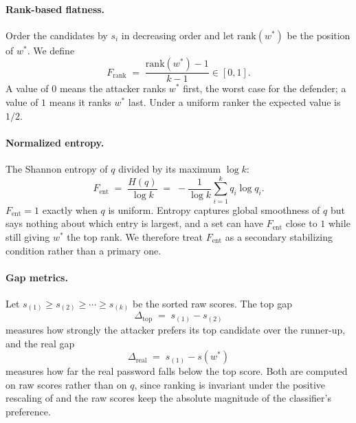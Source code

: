 \paragraph{Rank-based flatness.}
Order the candidates by $s_i$ in decreasing order and let
$\text{rank}(w^{*})$ be the position of $w^{*}$. We define
%
\begin{equation}
F_{\text{rank}} \;=\; \frac{\text{rank}(w^{*}) - 1}{k - 1} \in [0, 1].
\end{equation}
%
A value of $0$ means the attacker ranks $w^{*}$ first, the worst case
for the defender; a value of $1$ means it ranks $w^{*}$ last. Under a
uniform ranker the expected value is $1/2$.

\paragraph{Normalized entropy.}
The Shannon entropy of $q$ divided by its maximum $\log k$:
%
\begin{equation}
F_{\text{ent}} \;=\; \frac{H(q)}{\log k}
\;=\; -\frac{1}{\log k}\sum_{i=1}^{k} q_i \log q_i.
\end{equation}
%
$F_{\text{ent}} = 1$ exactly when $q$ is uniform. Entropy captures
global smoothness of $q$ but says nothing about which entry is largest,
and a set can have $F_{\text{ent}}$ close to $1$ while still giving
$w^{*}$ the top rank. We therefore treat $F_{\text{ent}}$ as a secondary
stabilizing condition rather than a primary one.

\paragraph{Gap metrics.}
Let $s_{(1)} \ge s_{(2)} \ge \cdots \ge s_{(k)}$ be the sorted raw
scores. The top gap
%
\begin{equation}
\Delta_{\text{top}} \;=\; s_{(1)} - s_{(2)}
\end{equation}
%
measures how strongly the attacker prefers its top candidate over the
runner-up, and the real gap
%
\begin{equation}
\Delta_{\text{real}} \;=\; s_{(1)} - s(w^{*})
\end{equation}
%
measures how far the real password falls below the top score. Both are
computed on raw scores rather than on $q$, since ranking is invariant
under the positive rescaling of  and the raw scores keep the
absolute magnitude of the classifier's preference.


